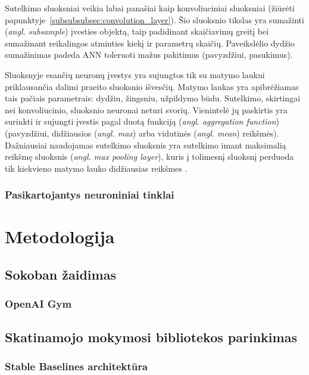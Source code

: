 \documentclass{VUMIFPSbakalaurinis}
\begin{document}
{
	Sutelkimo sluoksniai veikia labai panašiai kaip konvoliuciniai sluoksniai (žiūrėti papunktyje~\ref{subsubsubsec:convolution_layer}). Šio sluoksnio tikslas yra sumažinti (\textit{angl. subsample}) įvesties objektą, taip padidinant skaičiavimų greitį bei sumažinant reikalingos atminties kiekį ir parametrų skaičių. Paveikslėlio dydžio sumažinimas padeda ANN toleruoti mažus pakitimus (pavyzdžiui, pasukimus).\par
	
	Sluoksnyje esančių neuronų įvestys  yra sujungtos tik su matymo laukui priklausančia dalimi praeito sluoksnio išvesčių. Matymo laukas yra apibrėžiamas tais pačiais parametrais: dydžiu, žingsniu, užpildymo būdu. Sutelkimo, skirtingai nei konvoliucinio, sluoksnio neuronai neturi svorių. Vienintelė jų paskirtis yra surinkti ir sujungti įvestis pagal duotą funkciją (\textit{angl. aggregation function}) (pavyzdžiui, didžiausios (\textit{angl. max}) arba vidutinės (\textit{angl. mean}) reikšmės). Dažniausiai naudojamas sutelkimo sluoksnis yra sutelkimo imant maksimalią reikšmę sluoksnis (\textit{angl. max pooling layer}), kuris į tolimesnį sluoksnį perduoda tik kiekvieno matymo lauko didžiausias reikšmes \cite{handson}.\par
}

\subsubsection{Pasikartojantys neuroniniai tinklai}
{
	
}
\section{Metodologija}
{

}
\subsection{Sokoban žaidimas}
{

}
\subsubsection{OpenAI Gym}
{

}
\subsection{Skatinamojo mokymosi bibliotekos parinkimas}
\subsubsection{Stable Baselines architektūra}
\end{document}
